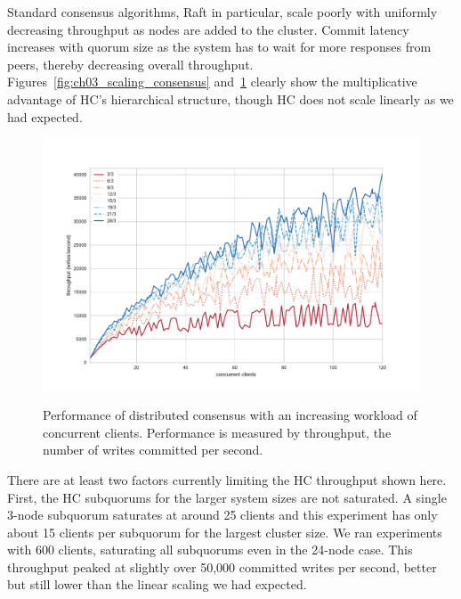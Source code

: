 Standard consensus algorithms, Raft in particular, scale poorly with uniformly decreasing throughput as nodes are added to the cluster.
Commit latency increases with quorum size as the system has to wait for more responses from peers, thereby decreasing overall throughput.
Figures~\ref{fig:ch03_scaling_consensus} and~\ref{fig:ch03_hc_throughput_workload} clearly show the multiplicative advantage of HC's hierarchical structure, though HC does not scale linearly as we had expected.

\begin{figure}
    \begin{center}
        \includegraphics[width=5in]{figures/ch03_hc_throughput_workload.pdf}
    \end{center}
    \renewcommand{\baselinestretch}{1}
    \small\normalsize

    \begin{quote}
        \caption[HC Throughput vs. Workload in the Wide Area]{Performance of distributed consensus with an increasing workload of concurrent clients. Performance is measured by throughput, the number of writes committed per second.}
        \label{fig:ch03_hc_throughput_workload}
    \end{quote}
\end{figure}
\renewcommand{\baselinestretch}{2}
\small\normalsize

There are at least two factors currently limiting the HC throughput shown here.
First, the HC subquorums for the larger system sizes are not saturated.
A single 3-node subquorum saturates at around 25 clients and this experiment has only about 15 clients per subquorum for the largest cluster size.
We ran experiments with 600 clients, saturating all subquorums even in the 24-node case.
This throughput peaked at slightly over 50,000 committed writes per second, better but still lower than the linear scaling we had expected.

